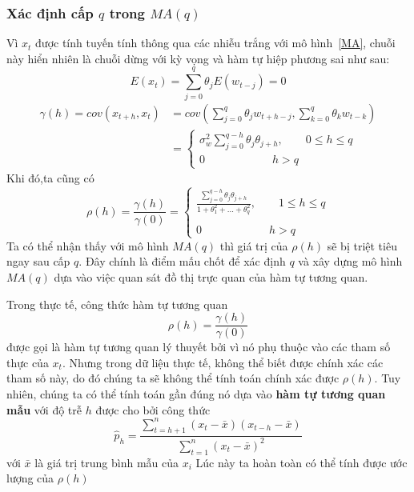 \subsubsection{Xác định cấp $q$ trong $MA(q)$}
Vì $x_t$ được tính tuyến tính thông qua các nhiễu trắng với mô hình~\ref{MA}, chuỗi này hiển nhiên là chuỗi dừng với kỳ vọng và hàm tự hiệp phương sai như sau:
\begin{equation}
	E(x_t) = \sum\limits_{j=0}^{q}\theta_{j}E(w_{t-j})=0
\end{equation}
\begin{align}
	\gamma(h)=cov(x_{t+h},x_t)&= cov(\sum\limits_{j=0}^{q}\theta_jw_{t+h-j},\sum\limits_{k=0}^{q}\theta_kw_{t-k})\\
	&= \begin{cases}
			\sigma_{w}^{2}\sum\limits_{j=0}^{q-h}\theta_j\theta_{j+h}, \qquad 0 \leq h \leq q \\
			0 \qquad\qquad\qquad h > q
		\end{cases}
\end{align}
Khi đó,ta cũng có 
\begin{equation}
	\rho(h) = \frac{\gamma(h)}{\gamma(0)}=
	\begin{cases}
		\frac{\sum\limits_{j=0}^{q-h}\theta_j\theta_{j+h}}{1+\theta_{1}^{2}+...+\theta_{q}^{2}} , \qquad 1 \leq h \leq q \\
		   \\
		0 \qquad\qquad\qquad h >q
	\end{cases}
\end{equation}
Ta có thể nhận thấy với mô hình $MA(q)$ thì giá trị của $\rho(h)$ sẽ bị triệt tiêu ngay sau cấp $q$. Đây chính là điểm mấu chốt để xác định $q$ và xây dựng mô hình $MA(q)$ dựa vào việc quan sát đồ thị trực quan của hàm tự tương quan.

Trong thực tế, công thức hàm tự tương quan 
\begin{equation}
	\rho(h) = \frac{\gamma(h)}{\gamma(0)}
\end{equation}
được gọi là hàm tự tương quan lý thuyết bởi vì nó phụ thuộc vào các tham số thực của $x_t$. Nhưng trong dữ liệu thực tế, không thể biết được chính xác các tham số này, do đó chúng ta sẽ không thể tính toán chính xác được $\rho(h)$. Tuy nhiên, chúng ta có thể tính toán gần đúng nó dựa vào \textbf{hàm tự tương quan mẫu} với độ trễ $h$ được cho bởi công thức
\begin{equation}
	\hat{p}_h = \frac{\sum\limits_{t=h+1}^{n}(x_t-\bar{x})(x_{t-h}-\bar{x})}{\sum\limits_{t=1}^{n}(x_t-\bar{x})^{2}}
\end{equation}
với $\bar{x}$ là giá trị trung bình mẫu của $x_i$
Lúc này ta hoàn toàn có thể tính được ước lượng của $\rho(h)$

